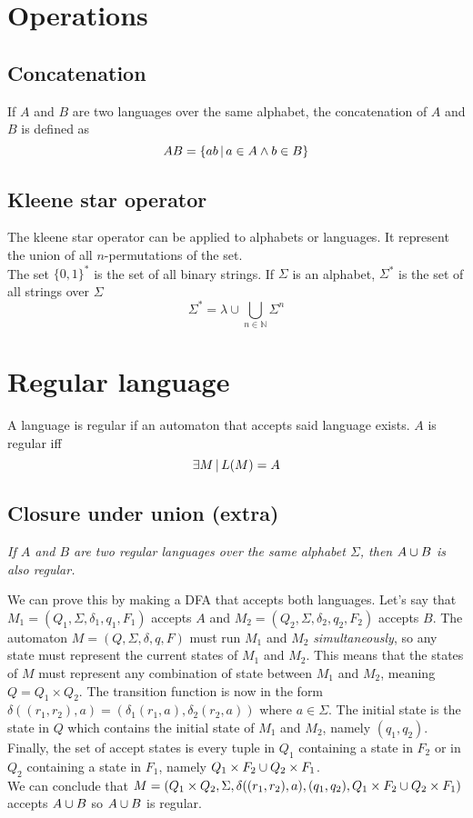 \documentclass{article}
\newcommand{\emptyString}{\lambda}
\begin{document}
\section{Operations}

\subsection{Concatenation}

If \(A\) and \(B\) are two languages over the same alphabet,
the concatenation of \(A\) and \(B\) is defined as
\[
    AB = \{ab \,|\, a \in A \land b \in B\}
\]

\subsection{Kleene star operator}

The kleene star operator can be applied to alphabets or languages.
It represent the union of all \(n\)-permutations of the set. \\
The set \(\{0,1\}^*\) is the set of
all binary strings. If \(\Sigma\) is an alphabet, \(\Sigma^*\) is the set
of all strings over \(\Sigma\)
\[
    \Sigma^* = \emptyString \cup \bigcup_{n\in\mathbb{N}} \Sigma^n
\]

\section{Regular language}

A language is regular if an automaton that accepts said language exists.
\(A\) is regular iff
\[
    \exists M \,|\, L(M) = A
\]

\subsection{Closure under union (extra)}

\textit{If \(A\) and \(B\) are two regular languages over the same alphabet
\(\Sigma\), then \(A \cup B\) is also regular.}

We can prove this by making a DFA that accepts both languages.
Let's say that \(M_1=(Q_1, \Sigma, \delta_1, q_1, F_1)\) accepts \(A\)
and \(M_2=(Q_2, \Sigma, \delta_2, q_2, F_2)\) accepts \(B\).
The automaton \(M=(Q, \Sigma, \delta, q, F)\) must run \(M_1\) and \(M_2\) \textit{simultaneously},
so any state must represent the current states of \(M_1\) and \(M_2\).
This means that the states of \(M\) must represent any combination of state between
\(M_1\) and \(M_2\), meaning \(Q=Q_1 \times Q_2\).
The transition function is now in the form
\(\delta((r_1, r_2), a) = (\delta_1(r_1, a), \delta_2(r_2, a))\) where \(a\in\Sigma\).
The initial state is the state in \(Q\) which contains the initial state of \(M_1\)
and \(M_2\), namely \((q_1, q_2)\). Finally, the set of accept states
is every tuple in \(Q_1\) containing a state in \(F_2\) or in \(Q_2\) containing a state in \(F_1\), namely
\(Q_1 \times F_2 \cup Q_2 \times F_1\). \\
We can conclude that \(M=(Q_1 \times Q_2, \Sigma, \delta((r_1, r_2), a), (q_1, q_2), Q_1 \times F_2 \cup Q_2 \times F_1)\)
accepts \(A \cup B\) so \(A \cup B\) is regular.
\end{document}
